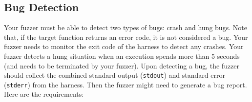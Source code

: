 \documentclass[letterpaper,11pt]{article}
\begin{document}

\subsection{Bug Detection}
\label{subsec:bug}

Your fuzzer must be able to detect two types of bugs: crash and hung bugs.
Note that, if the target function returns an error code, it is not considered a bug.
Your fuzzer needs to monitor the exit code of the harness to detect any crashes.
Your fuzzer detects a hung situation when an execution spends more than 5 seconds (and needs to be terminated by your fuzzer).
Upon detecting a bug, the fuzzer should collect the combined standard output (\texttt{stdout}) and standard error (\texttt{stderr}) from the harness.
Then the fuzzer might need to generate a bug report.
 Here are the requirements:
\end{document}
